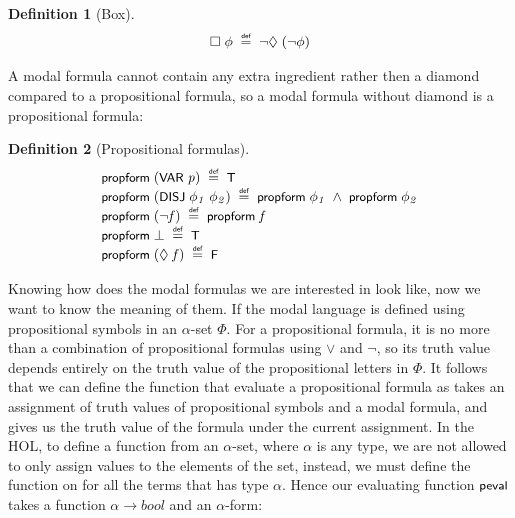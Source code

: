 \documentclass[letterpaper]{article}
\newtheorem{defn}{Definition}
\renewcommand{\HOLConst}[1]{{\textsf{\upshape\small #1}}}
\renewcommand{\HOLinline}[1]{\ensuremath{#1}}
\newenvironment{holmath}{\begin{displaymath}\begin{array}{l}}{\end{array}\end{displaymath}\ignorespacesafterend}
\begin{document}
\begin{defn}[Box]
\begin{holmath}
  \HOLSymConst{\ensuremath{\Box}}\;\HOLFreeVar{\ensuremath{\phi}}\;\HOLSymConst{\HOLTokenDefEquality{}}\;\HOLSymConst{\HOLTokenNeg{}}\HOLSymConst{\ensuremath{\Diamond}}\;(\HOLSymConst{\HOLTokenNeg{}}\HOLFreeVar{\ensuremath{\phi}})
\end{holmath}
\end{defn}

A modal formula cannot contain any extra ingredient rather then a diamond compared to a propositional formula, so a modal formula without diamond is a propositional formula:

\begin{defn}[Propositional formulas]
\begin{holmath}
  \HOLConst{propform}\;(\HOLConst{VAR}\;\HOLFreeVar{p})\;\HOLSymConst{\HOLTokenDefEquality{}}\;\HOLConst{T}\\
\HOLConst{propform}\;(\HOLConst{DISJ}\;\HOLFreeVar{\ensuremath{\phi\sb{1}}}\;\HOLFreeVar{\ensuremath{\phi\sb{2}}})\;\HOLSymConst{\HOLTokenDefEquality{}}\;\HOLConst{propform}\;\HOLFreeVar{\ensuremath{\phi\sb{1}}}\;\HOLSymConst{\HOLTokenConj{}}\;\HOLConst{propform}\;\HOLFreeVar{\ensuremath{\phi\sb{2}}}\\
\HOLConst{propform}\;(\HOLSymConst{\HOLTokenNeg{}}\HOLFreeVar{f})\;\HOLSymConst{\HOLTokenDefEquality{}}\;\HOLConst{propform}\;\HOLFreeVar{f}\\
\HOLConst{propform}\;\HOLSymConst{\ensuremath{\bot}}\;\HOLSymConst{\HOLTokenDefEquality{}}\;\HOLConst{T}\\
\HOLConst{propform}\;(\HOLSymConst{\ensuremath{\Diamond}}\;\HOLFreeVar{f})\;\HOLSymConst{\HOLTokenDefEquality{}}\;\HOLConst{F}
\end{holmath}
\end{defn}

Knowing how does the modal formulas we are interested in look like, now we want to know the meaning of them. If the modal language is defined using propositional symbols in an $\alpha$-set $\Phi$. For a propositional formula, it is no more than a combination of propositional formulas using $\lor$ and $\lnot$, so its truth value depends entirely on the truth value of the propositional letters in $\Phi$. It follows that we can define the function that evaluate a propositional formula as takes an assignment of truth values of propositional symbols and a modal formula, and gives us the truth value of the formula under the current assignment. In the HOL, to define a function from an $\alpha$-set, where $\alpha$ is any type, we are not allowed to only assign values to the elements of the set, instead, we must define the function on for all the terms that has type $\alpha$. Hence our evaluating function \HOLinline{\HOLConst{peval}} takes a function $\alpha\to bool$ and an $\alpha$-form:
\end{document}
